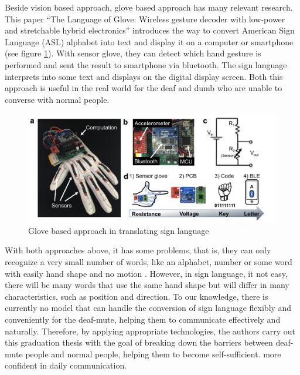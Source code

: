   Beside vision based approach, glove based approach has many relevant research. This paper “The Language of Glove: Wireless gesture
  decoder with low-power and stretchable hybrid electronics” \cite{o2017language} introduces the way to convert American
  Sign Language (ASL) alphabet into text and display it on a computer 
  or smartphone (see figure \ref{fig:Chap2-Glove-Base}). With sensor glove, they can detect which hand gesture is
  performed and sent the result to smartphone via bluetooth. The sign language
  interprets into some text and displays on the digital display screen.
  Both this approach is useful in the real world for the deaf and dumb 
  who are unable to converse with normal people.

  \begin{figure}[H]
    \centering
    \includegraphics[width=\textwidth]{img/Chap2/Glove-Based.png}
    \caption{Glove based approach in translating sign language}
    \label{fig:Chap2-Glove-Base}
  \end{figure}

  With both approaches above, it has some problems, that is, they can only recognize 
  a very small number of words, like an alphabet, number or some word with easily hand shape and no motion .
  However, in sign language, it not easy, there will be many words 
  that use the same hand shape but will differ in many characteristics, such as position 
  and direction. To our knowledge, there is currently no model that can handle the 
  conversion of sign language flexibly and conveniently for the deaf-mute, helping them 
  to communicate effectively and naturally. Therefore, by applying appropriate 
  technologies, the authors carry out this graduation thesis with the goal of breaking down 
  the barriers between deaf-mute people and normal people, helping them to become self-sufficient. 
  more confident in daily communication.


